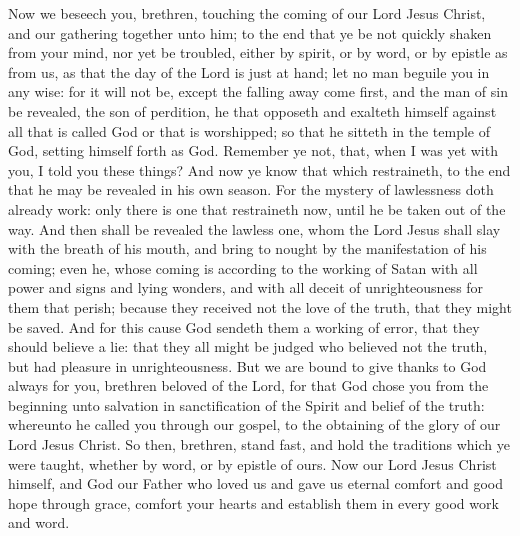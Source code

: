 Now we beseech you, brethren, touching the coming of our Lord Jesus Christ, and our gathering together unto him; to the end that ye be not quickly shaken from your mind, nor yet be troubled, either by spirit, or by word, or by epistle as from us, as that the day of the Lord is just at hand; let no man beguile you in any wise: for it will not be, except the falling away come first, and the man of sin be revealed, the son of perdition, he that opposeth and exalteth himself against all that is called God or that is worshipped; so that he sitteth in the temple of God, setting himself forth as God. Remember ye not, that, when I was yet with you, I told you these things? And now ye know that which restraineth, to the end that he may be revealed in his own season. For the mystery of lawlessness doth already work: only there is one that restraineth now, until he be taken out of the way. And then shall be revealed the lawless one, whom the Lord Jesus shall slay with the breath of his mouth, and bring to nought by the manifestation of his coming; even he, whose coming is according to the working of Satan with all power and signs and lying wonders, and with all deceit of unrighteousness for them that perish; because they received not the love of the truth, that they might be saved. And for this cause God sendeth them a working of error, that they should believe a lie: that they all might be judged who believed not the truth, but had pleasure in unrighteousness.  But we are bound to give thanks to God always for you, brethren beloved of the Lord, for that God chose you from the beginning unto salvation in sanctification of the Spirit and belief of the truth: whereunto he called you through our gospel, to the obtaining of the glory of our Lord Jesus Christ. So then, brethren, stand fast, and hold the traditions which ye were taught, whether by word, or by epistle of ours.  Now our Lord Jesus Christ himself, and God our Father who loved us and gave us eternal comfort and good hope through grace, comfort your hearts and establish them in every good work and word. 

